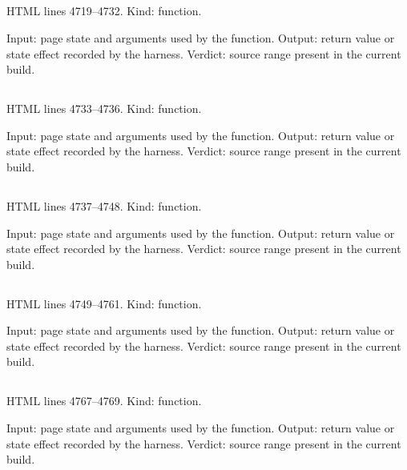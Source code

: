 \subsection*{\texttt{}}
\label{vf_194_sopSampleRows}
HTML lines 4719--4732. Kind: function.

Input: page state and arguments used by the function.
Output: return value or state effect recorded by the harness.
Verdict: source range present in the current build.

\subsection*{\texttt{}}
\label{vf_195_sopCriteriaRows}
HTML lines 4733--4736. Kind: function.

Input: page state and arguments used by the function.
Output: return value or state effect recorded by the harness.
Verdict: source range present in the current build.

\subsection*{\texttt{}}
\label{vf_196_sopRunRows}
HTML lines 4737--4748. Kind: function.

Input: page state and arguments used by the function.
Output: return value or state effect recorded by the harness.
Verdict: source range present in the current build.

\subsection*{\texttt{}}
\label{vf_197_sopEvents}
HTML lines 4749--4761. Kind: function.

Input: page state and arguments used by the function.
Output: return value or state effect recorded by the harness.
Verdict: source range present in the current build.

\subsection*{\texttt{}}
\label{vf_198_invalidateAnalysisCaches}
HTML lines 4767--4769. Kind: function.

Input: page state and arguments used by the function.
Output: return value or state effect recorded by the harness.
Verdict: source range present in the current build.

